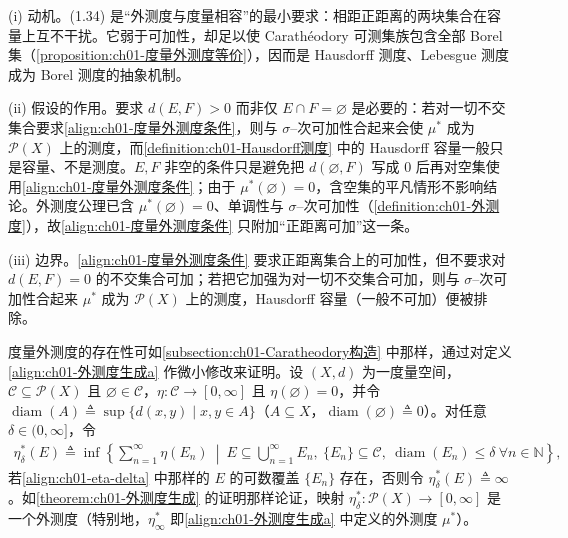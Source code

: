 \documentclass[../../main.tex]{subfiles}%
\begin{document}
\begin{remark}\label{remark:ch01-度量外测度动机}
(i) 动机。(1.34) 是“外测度与度量相容”的最小要求：相距正距离的两块集合在容量上互不干扰。它弱于可加性，却足以使 Carathéodory 可测集族包含全部 Borel 集（\cref{proposition:ch01-度量外测度等价}），因而是 Hausdorff 测度、Lebesgue 测度成为 Borel 测度的抽象机制。

(ii) 假设的作用。要求 $d(E,F)>0$ 而非仅 $E\cap F=\varnothing$ 是必要的：若对一切不交集合要求\eqref{align:ch01-度量外测度条件}，则与 $\sigma$--次可加性合起来会使 $\mu^*$ 成为 $\mathcal{P}(X)$ 上的测度，而\cref{definition:ch01-Hausdorff测度} 中的 Hausdorff 容量一般只是容量、不是测度。$E,F$ 非空的条件只是避免把 $d(\varnothing,F)$ 写成 $0$ 后再对空集使用\eqref{align:ch01-度量外测度条件}；由于 $\mu^*(\varnothing)=0$，含空集的平凡情形不影响结论。外测度公理已含 $\mu^*(\varnothing)=0$、单调性与 $\sigma$--次可加性（\cref{definition:ch01-外测度}），故\eqref{align:ch01-度量外测度条件} 只附加“正距离可加”这一条。

(iii) 边界。\eqref{align:ch01-度量外测度条件} 要求正距离集合上的可加性，但不要求对 $d(E,F)=0$ 的不交集合可加；若把它加强为对一切不交集合可加，则与 $\sigma$--次可加性合起来 $\mu^*$ 成为 $\mathcal{P}(X)$ 上的测度，Hausdorff 容量（一般不可加）便被排除。
\end{remark}

度量外测度的存在性可如\cref{subsection:ch01-Caratheodory构造} 中那样，通过对定义\eqref{align:ch01-外测度生成a} 作微小修改来证明。设 $(X,d)$ 为一度量空间，$\mathcal{C}\subseteq\mathcal{P}(X)$ 且 $\varnothing\in\mathcal{C}$，$\eta:\mathcal{C}\to[0,\infty]$ 且 $\eta(\varnothing)=0$，并令 $\operatorname{diam}(A)\triangleq\sup\{d(x,y)\mid x,y\in A\}$（$A\subseteq X$，$\operatorname{diam}(\varnothing)\triangleq0$）。对任意 $\delta\in(0,\infty]$，令
\begin{align}
\eta_\delta^*(E)\triangleq\inf\left\{\sum_{n=1}^\infty\eta(E_n)\ \middle|\ E\subseteq\bigcup_{n=1}^\infty E_n,\ \{E_n\}\subseteq\mathcal{C},\ \operatorname{diam}(E_n)\leqslant\delta\ \forall n\in\mathbb{N}\right\}, \label{align:ch01-eta-delta}
\end{align}
若\eqref{align:ch01-eta-delta} 中那样的 $E$ 的可数覆盖 $\{E_n\}$ 存在，否则令 $\eta_\delta^*(E)\triangleq\infty$。如\cref{theorem:ch01-外测度生成} 的证明那样论证，映射 $\eta_\delta^*:\mathcal{P}(X)\to[0,\infty]$ 是一个外测度（特别地，$\eta_\infty^*$ 即\eqref{align:ch01-外测度生成a} 中定义的外测度 $\mu^*$）。
\end{document}
